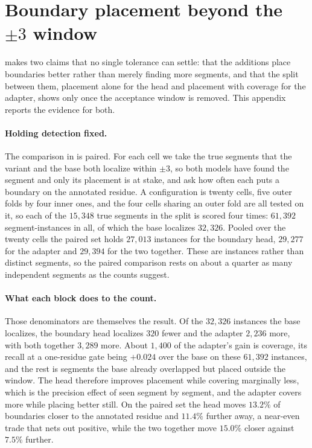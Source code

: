 \documentclass{article}
\begin{document}
\FloatBarrier

\section{Boundary placement beyond the $\pm3$ window}
\label{sec:app-quality}

 makes two claims that no single tolerance can settle: that the additions place
boundaries better rather than merely finding more segments, and that the split between them, placement
alone for the head and placement with coverage for the adapter, shows only once the acceptance
window is removed. This appendix reports the evidence for both.

\paragraph{Holding detection fixed.} The comparison in  is paired. For each cell
we take the true segments that the variant and the base both localize within $\pm3$, so both models
have found the segment and only its placement is at stake, and ask how often each puts a boundary
on the annotated residue. A configuration is twenty
cells, five outer folds by four inner ones, and the four cells sharing an outer fold are all tested
on it, so each of the $15{,}348$ true segments in the split is scored four times: $61{,}392$
segment-instances in all, of which the base localizes $32{,}326$. Pooled over the twenty cells the
paired set holds $27{,}013$ instances for the boundary head, $29{,}277$ for the adapter and
$29{,}394$ for the two together. These are instances rather than distinct segments, so the paired
comparison rests on about a quarter as many independent segments as the counts suggest.

\paragraph{What each block does to the count.} Those denominators are themselves the result. Of the
$32{,}326$ instances the base localizes, the boundary head localizes $320$ fewer and the adapter
$2{,}236$ more, with both together $3{,}289$ more. About $1{,}400$ of the adapter's gain is
coverage, its recall at a one-residue gate being $+0.024$ over the base on these $61{,}392$
instances, and the rest is segments the base already overlapped but placed outside the window. The head therefore
improves placement while covering marginally less, which is the precision effect of
 seen segment by segment, and the adapter covers more while placing better
still. On the paired
set the head moves $13.2\%$ of boundaries closer to the annotated residue and $11.4\%$ further
away, a near-even trade that nets out positive, while the two together move $15.0\%$ closer against
$7.5\%$ further.
\end{document}
